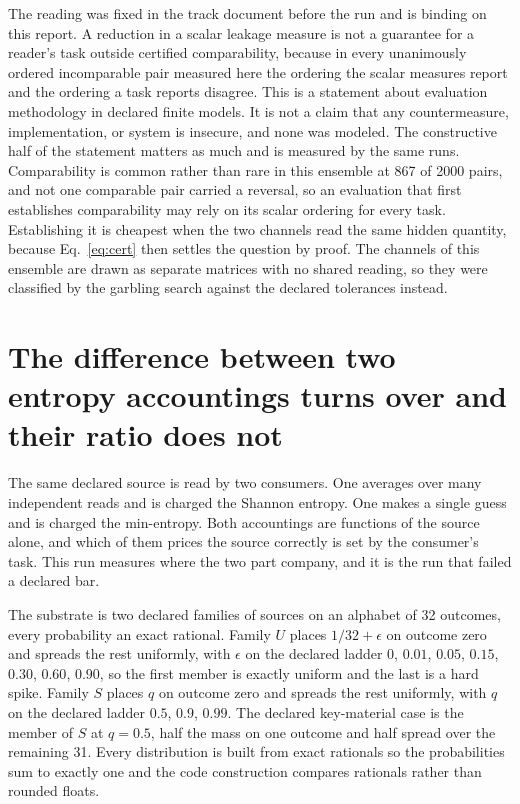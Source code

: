 \documentclass[aps,pre,reprint,nofootinbib]{revtex4-2}
\begin{document}
The reading was fixed in the track document before the run and is
binding on this report.  A reduction in a scalar leakage measure is
not a guarantee for a reader's task outside certified comparability,
because in every unanimously ordered incomparable pair measured here
the ordering the scalar measures report and the ordering a task
reports disagree.  This is a statement about evaluation methodology
in declared finite models.  It is not a claim that any countermeasure,
implementation, or system is insecure, and none was modeled.  The
constructive half of the statement matters as much and is measured by
the same runs.  Comparability is common rather than rare in this
ensemble at 867 of 2000 pairs, and not one comparable pair carried a
reversal, so an evaluation that first establishes comparability may
rely on its scalar ordering for every task.  Establishing it is
cheapest when the two channels read the same hidden quantity, because
Eq.~\eqref{eq:cert} then settles the question by proof.  The channels
of this ensemble are drawn as separate matrices with no shared
reading, so they were classified by the garbling search against the
declared tolerances instead.

\section{The difference between two entropy accountings turns over and
their ratio does not}
\label{sec:cr3}

The same declared source is read by two consumers.  One averages over
many independent reads and is charged the Shannon entropy.  One makes
a single guess and is charged the min-entropy.  Both accountings are
functions of the source alone, and which of them prices the source
correctly is set by the consumer's task.  This run measures where the
two part company, and it is the run that failed a declared bar.

The substrate is two declared families of sources on an alphabet of 32
outcomes, every probability an exact rational.  Family $U$ places
$1/32 + \epsilon$ on outcome zero and spreads the rest uniformly, with
$\epsilon$ on the declared ladder $0$, $0.01$, $0.05$, $0.15$, $0.30$,
$0.60$, $0.90$, so the first member is exactly uniform and the last is
a hard spike.  Family $S$ places $q$ on outcome zero and spreads the
rest uniformly, with $q$ on the declared ladder $0.5$, $0.9$, $0.99$.
The declared key-material case is the member of $S$ at $q = 0.5$, half
the mass on one outcome and half spread over the remaining 31.  Every
distribution is built from exact rationals so the probabilities sum to
exactly one and the code construction compares rationals rather than
rounded floats.
\end{document}
